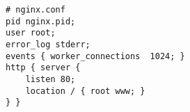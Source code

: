 \begin{lstlisting}
# nginx.conf
pid nginx.pid;
user root;
error_log stderr;
events { worker_connections  1024; }
http { server {
    listen 80;
    location / { root www; }
} }
\end{lstlisting}

%
%
%

